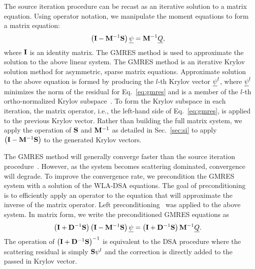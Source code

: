The source iteration procedure can be recast as an iterative solution to a matrix
equation. Using operator notation, we manipulate
the moment equations to form a matrix equation:
\begin{equation}\label{eq:gmres}
    \left(\mathbf{I}  - \mathbf{M}^{-1}\mathbf{S}\right) \underline{\psi} = \mathbf{M}^{-1} \underline{Q},
\end{equation}
where $\mathbf{I}$ is an identity matrix.  The GMRES method is used to approximate
the solution to the above
linear system. The GMRES method is an iterative Krylov solution method for asymmetric, sparse matrix
equations.  Approximate solution to the above equation is formed by producing the $l$-th
Krylov vector $\underline{\psi}^l$, where $\underline{\psi}^l$ minimizes the norm of the residual for
Eq.~\eqref{eq:gmres} and is a member of the $l$-th ortho-normalized Krylov
subspace~\cite{saad}.  To form the Krylov subspace in each iteration, the
matrix operator, i.e., the left-hand side of Eq.~\eqref{eq:gmres}, is applied to the
previous Krylov vector.  Rather than building the full matrix system, we apply the
operation of $\mathbf{S}$ and $\mathbf{M}^{-1}$ as detailed in Sec.~\eqref{sec:si} to apply $\left(\mathbf{I}  - \mathbf{M}^{-1}\mathbf{S}\right)$ to the generated Krylov vectors. 

The GMRES method will generally converge faster than the source iteration
procedure~\cite{morel_dsa}.  However, as the system becomes scattering dominated,
convergence will degrade.  To improve the convergence rate, we precondition the GMRES
system with a solution of the WLA-DSA equations.  The goal of preconditioning is to efficiently apply an
operator to the equation that will approximate the inverse of the matrix operator. Left
preconditioning~\cite{saad} was applied to the above system.  In matrix form, we write the preconditioned GMRES equations as
\begin{equation}
    \left(\mathbf{I} + \mathbf{D}^{-1} \mathbf{S}\right)\left(\mathbf{I} - \mathbf{M}^{-1} \mathbf{S} \right) \underline{\psi} = \left( \mathbf{I} + \mathbf{D}^{-1}\mathbf{S}\right) \mathbf{M}^{-1}\underline{Q}.
\end{equation}
The operation of $\left(\mathbf{I} + \mathbf{D}^{-1} \mathbf{S}\right)^{-1}$ is equivalent to the DSA
procedure where the scattering residual is simply $\mathbf{S} \psi^{l}$ and the correction is
directly added to the passed in Krylov vector.

